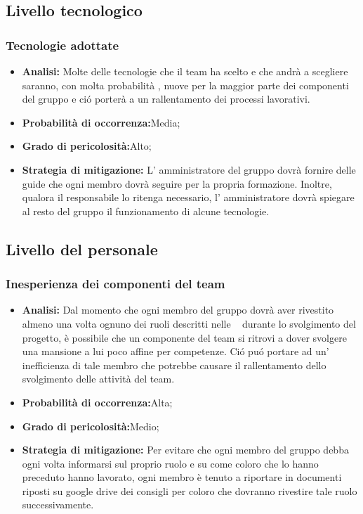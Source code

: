 \subsection{Livello tecnologico}
\subsubsection{Tecnologie adottate}
	\begin{itemize}
	\item \textbf{Analisi: }Molte delle tecnologie che il team \gruppo ha scelto e che andrà a scegliere saranno, con molta probabilità , nuove per la maggior parte dei componenti del gruppo e ci\'o porterà a un rallentamento dei processi lavorativi.
	\item \textbf{Probabilità di occorrenza:}Media;
	\item \textbf{Grado di pericolosità:}Alto;
	\item \textbf{Strategia di mitigazione: }L' amministratore del gruppo dovrà fornire delle guide che ogni membro dovrà seguire per la propria formazione. Inoltre, qualora il responsabile lo ritenga necessario, l' amministratore dovrà spiegare al resto del gruppo il funzionamento di alcune tecnologie.
	\end{itemize}
\subsection{Livello del personale}
\subsubsection{Inesperienza dei componenti del team}
	\begin{itemize}
	\item \textbf{Analisi: }Dal momento che ogni membro del gruppo dovrà aver rivestito almeno una volta  ognuno dei ruoli descritti nelle \infoNDP~ durante lo svolgimento del progetto, è possibile che un componente del team si ritrovi a dover svolgere una mansione a lui poco affine per competenze. Ci\'o pu\'o portare ad un' inefficienza di tale membro che potrebbe causare il rallentamento dello svolgimento delle attività del team.
	\item \textbf{Probabilità di occorrenza:}Alta;
	\item \textbf{Grado di pericolosità:}Medio;
	\item \textbf{Strategia di mitigazione: }Per evitare che ogni membro del gruppo debba ogni volta informarsi sul proprio ruolo e su come coloro che lo hanno preceduto hanno lavorato, ogni membro è  tenuto a riportare in documenti riposti su google drive dei consigli per coloro che dovranno rivestire tale ruolo successivamente.
	\end{itemize}

